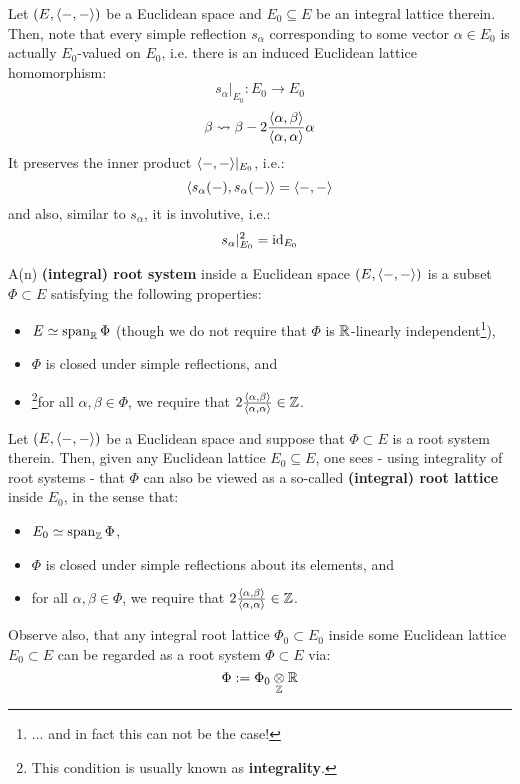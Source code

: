             \begin{remark} \label{remark: integral_simple_reflections}
                Let $(E, \langle-, -\rangle)$ be a Euclidean space and $E_0 \subseteq E$ be an integral lattice therein. Then, note that every simple reflection $s_{\alpha}$ corresponding to some vector $\alpha \in E_0$ is actually $E_0$-valued on $E_0$, i.e. there is an induced Euclidean lattice homomorphism:
                    $$s_{\alpha}|_{E_0}: E_0 \to E_0$$
                    $$\beta \leadsto \beta - 2\frac{\langle\alpha, \beta\rangle}{\langle\alpha, \alpha\rangle} \alpha$$
                It preserves the inner product $\langle-, -\rangle|_{E_0}$, i.e.:
                    $$\langle s_{\alpha}(-), s_{\alpha}(-)\rangle = \langle-, -\rangle$$
                and also, similar to $s_{\alpha}$, it is involutive, i.e.:
                    $$s_{\alpha}|_{E_0}^2 = \mathrm{id}_{E_0}$$
            \end{remark}
            \begin{definition} \label{def: root_systems}
                A(n) \textbf{(integral) root system} inside a Euclidean space $(E, \langle-, -\rangle)$ is a subset $\Phi \subset E$ satisfying the following properties:
                    \begin{itemize}
                        \item $E \simeq \operatorname{span}_{\mathbb{R}} \Phi$ (though we do not require that $\Phi$ is $\mathbb{R}$-linearly independent\footnote{... and in fact this can not be the case!}),
                        \item $\Phi$ is closed under simple reflections, and
                        \item \footnote{This condition is usually known as \textbf{integrality}.}for all $\alpha, \beta \in \Phi$, we require that $2\frac{\langle\alpha, \beta\rangle}{\langle\alpha, \alpha\rangle} \in \mathbb{Z}$.
                    \end{itemize}
            \end{definition}
            \begin{remark} \label{remark: root_lattices}
                Let $(E, \langle-, -\rangle)$ be a Euclidean space and suppose that $\Phi \subset E$ is a root system therein. Then, given any Euclidean lattice $E_0 \subseteq E$, one sees - using integrality of root systems - that $\Phi$ can also be viewed as a so-called \textbf{(integral) root lattice} inside $E_0$, in the sense that:
                    \begin{itemize}
                        \item $E_0 \simeq \operatorname{span}_{\mathbb{Z}} \Phi$,
                        \item $\Phi$ is closed under simple reflections about its elements, and
                        \item for all $\alpha, \beta \in \Phi$, we require that $2\frac{\langle\alpha, \beta\rangle}{\langle\alpha, \alpha\rangle} \in \mathbb{Z}$.
                    \end{itemize}
                Observe also, that any integral root lattice $\Phi_0 \subset E_0$ inside some Euclidean lattice $E_0 \subset E$ can be regarded as a root system $\Phi \subset E$ via:
                    $$\Phi := \Phi_0 \tensor_{\Z} \R$$
            \end{remark}
